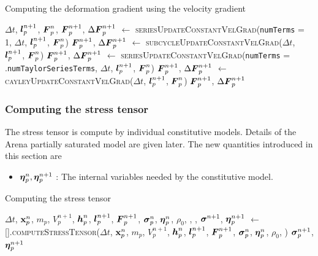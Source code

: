 \begin{breakablealgorithm}
  \caption{Computing the deformation gradient using the velocity gradient}
  \begin{algorithmic}[1]
    \Require $\Delta t$, $\boldsymbol{l}_p^{n+1}$, $\boldsymbol{F}_p^n$,
         \State $\boldsymbol{F}_p^{n+1}$, $\Delta\boldsymbol{F}_p^{n+1}$  $\leftarrow$ 
           \textsc{seriesUpdateConstantVelGrad}(\texttt{numTerms} = 1, $\Delta t$, $\boldsymbol{l}_p^{n+1}$, $\boldsymbol{F}_p^n$) 
         \State $\boldsymbol{F}_p^{n+1}$, $\Delta\boldsymbol{F}_p^{n+1}$  $\leftarrow$
           \textsc{subcycleUpdateConstantVelGrad}($\Delta t$, $\boldsymbol{l}_p^{n+1}$, $\boldsymbol{F}_p^n$) 
         \State $\boldsymbol{F}_p^{n+1}$, $\Delta\boldsymbol{F}_p^{n+1}$  $\leftarrow$
           \textsc{seriesUpdateConstantVelGrad}(\texttt{numTerms} = .\texttt{numTaylorSeriesTerms}, 
              $\Delta t$, $\boldsymbol{l}_p^{n+1}$, $\boldsymbol{F}_p^n$) 
      \Else
         \State $\boldsymbol{F}_p^{n+1}$, $\Delta\boldsymbol{F}_p^{n+1}$  $\leftarrow$
           \textsc{cayleyUpdateConstantVelGrad}($\Delta t$, $\boldsymbol{l}_p^{n+1}$, $\boldsymbol{F}_p^n$) 
      \EndIf
      \State \Return $\boldsymbol{F}_p^{n+1}$, $\Delta\boldsymbol{F}_p^{n+1}$ 
    \EndProcedure
  \end{algorithmic}
\end{breakablealgorithm}

\subsubsection{Computing the stress tensor}
The stress tensor is compute by individual constitutive models.  Details of the Arena partially
saturated model are given later. The new quantities introduced in this section are
\begin{itemize} 
  \setlength\itemsep{1pt}
  \item $\boldsymbol{\eta}_p^n, \boldsymbol{\eta}_p^{n+1}$ : {\Ochre The internal variables needed by the constitutive model.}
\end{itemize}
\begin{breakablealgorithm}
  \caption{Computing the stress tensor}
  \begin{algorithmic}[1]
    \Require $\Delta t$, $\mathbf{x}_p^n$, $m_p$, $V_p^{n+1}$, $\boldsymbol{h}_p^n$, $\boldsymbol{l}_p^{n+1}$, $\boldsymbol{F}_p^{n+1}$,
             $\boldsymbol{\sigma}_p^n$, $\boldsymbol{\eta}_p^n$, $\rho_0$, , , 
        \State $\boldsymbol{\sigma}^{n+1}$, $\boldsymbol{\eta}_p^{n+1}$ $\leftarrow$
          [\TTmatl].\textsc{computeStressTensor}($\Delta t$, $\mathbf{x}_p^n$, $m_p$, 
             $V_p^{n+1}$, $\boldsymbol{h}_p^n$, \WWRP 
             $\boldsymbol{l}_p^{n+1}$, $\boldsymbol{F}_p^{n+1}$, $\boldsymbol{\sigma}_p^n$, $\boldsymbol{\eta}_p^n$, $\rho_0$, )
      \EndFor
      \State \Return $\boldsymbol{\sigma}_p^{n+1}$, $\boldsymbol{\eta}_p^{n+1}$
    \EndProcedure
  \end{algorithmic}
\end{breakablealgorithm}

